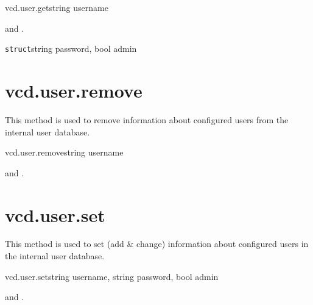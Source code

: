\begin{rpcsynopsis}{vcd.user.get}{string username}
\end{rpcsynopsis}

\begin{rpcaccess}
 and \rpcnoownerchecks.
\end{rpcaccess}

\begin{rpcreturncomplex}{\texttt{struct}}{string password, bool admin}
\end{rpcreturncomplex}


\section{vcd.user.remove}

This method is used to remove information about configured users from the
internal user database.

\begin{rpcsynopsis}{vcd.user.remove}{string username}
\end{rpcsynopsis}

\begin{rpcaccess}
 and \rpcnoownerchecks.
\end{rpcaccess}

\rpcreturnnil

\rpcnoerrors


\section{vcd.user.set}

This method is used to set (add \& change) information about configured users
in the internal user database.

\begin{rpcsynopsis}{vcd.user.set}{string username, string password,
	bool admin}
\end{rpcsynopsis}

\begin{rpcaccess}
 and \rpcnoownerchecks.
\end{rpcaccess}

\rpcreturnnil

\rpcnoerrors


